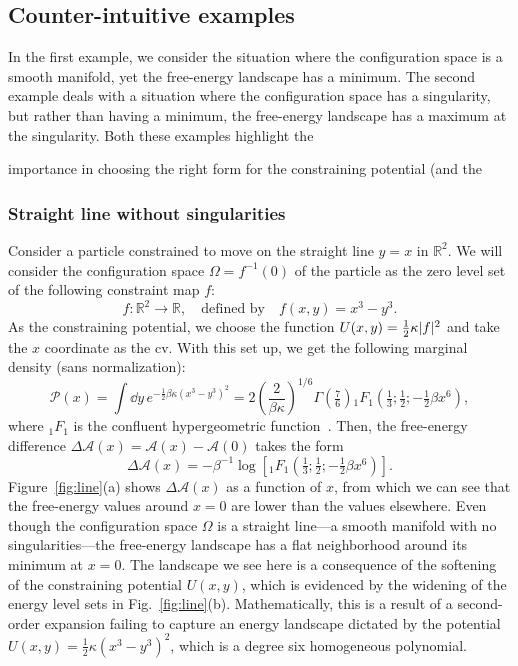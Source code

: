 \begin{subappendices}
\subsection{Counter-intuitive examples}

In the first example, we consider the situation where the configuration space is a smooth manifold, yet the free-energy landscape has a minimum.
The second example deals with a situation where the configuration space has a singularity, but rather than having a minimum, the free-energy landscape has a maximum at the singularity.
Both these examples highlight the

importance in choosing the right form for the constraining potential (and the

\subsubsection*{Straight line without singularities}

Consider a particle constrained to move on the straight line $y = x$ in $\mathbb{R}^{2}$.
We will consider the configuration space $\Omega = f^{-1}(0)$ of the particle as the zero level set of the following constraint map $f$:
%
\begin{equation}
  f: \mathbb{R}^{2} \to \mathbb{R},
  \quad\text{defined by}\quad
  f(x, y) = x^{3} - y^{3}.
\end{equation}
%
As the constraining potential, we choose the function $U(x, y) = \frac{1}{2}\kappa\lvert f\rvert^{2}$ and take the $x$ coordinate as the \ac{cv}.
With this set up, we get the following marginal density (sans normalization):
%
\begin{equation}
  \mathscr{P}(x) = \int \dd{y}\,e^{-\frac{1}{2}\beta\kappa (x^{3}-y^{3})^{2}}= 2\left(\frac{2}{\beta\kappa}\right)^{1/6}\Gamma\left(\tfrac{7}{6}\right){}_{1}\!F_{1}\left(\tfrac{1}{3};\tfrac{1}{2};-\tfrac{1}{2}\beta x^{6}\right),
\end{equation}
%
where ${}_{1}\!F_{1}$ is the confluent hypergeometric function~\cite{olver2010}.
Then, the free-energy difference $\Delta\mathscr{A}(x) = \mathscr{A}(x) - \mathscr{A}(0)$ takes the form
%
\begin{equation}
  \Delta\mathscr{A}(x) = -\beta^{-1}\log\left[{}_{1}\!F_{1}\left(\tfrac{1}{3};\tfrac{1}{2};-\tfrac{1}{2}\beta x^{6}\right)\right].
\end{equation}
%
Figure~\ref{fig:line}(a) shows $\Delta\mathscr{A}(x)$ as a function of $x$, from which we can see that the free-energy values around $x = 0$ are lower than the values elsewhere.
Even though the configuration space $\Omega$ is a straight line---a smooth manifold with no singularities---the free-energy landscape has a flat neighborhood around its minimum at $x = 0$.
The landscape we see here is a consequence of the softening of the constraining potential $U(x, y)$, which is evidenced by the widening of the energy level sets in Fig.~\ref{fig:line}(b).
Mathematically, this is a result of a second-order expansion failing to capture an energy landscape dictated by the potential $U(x, y) = \frac{1}{2}\kappa(x^{3}-y^{3})^{2}$, which is a degree six homogeneous polynomial.


\end{subappendices}
